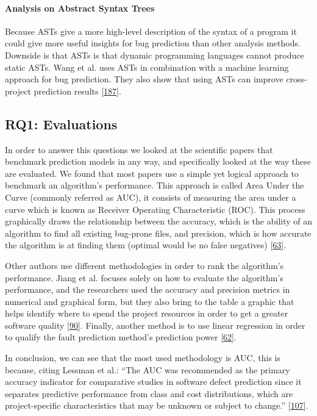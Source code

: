 \documentclass[]{book}
\let\oldparagraph\paragraph
\renewcommand{\paragraph}[1]{\oldparagraph{#1}\mbox{}}
\begin{document}
\paragraph{Analysis on Abstract Syntax
Trees}\label{analysis-on-abstract-syntax-trees}

Because ASTs give a more high-level description of the syntax of a
program it could give more useful insights for bug prediction than other
analysis methods. Downside is that ASTs is that dynamic programming
languages cannot produce static ASTs. Wang et al. uses ASTs in
combination with a machine learning approach for bug prediction. They
also show that using ASTs can improve cross-project prediction results
{[}\protect\hyperlink{ref-wang2016}{187}{]}.

\subsection{RQ1: Evaluations}\label{rq1-evaluations}

In order to answer this questions we looked at the scientific papers
that benchmark prediction models in any way, and specifically looked at
the way these are evaluated. We found that most papers use a simple yet
logical approach to benchmark an algorithm's performance. This approach
is called Area Under the Curve (commonly referred as AUC), it consists
of measuring the area under a curve which is known as Receiver Operating
Characteristic (ROC). This process graphically draws the relationship
between the accuracy, which is the ability of an algorithm to find all
existing bug-prone files, and precision, which is how accurate the
algorithm is at finding them (optimal would be no false negatives)
{[}\protect\hyperlink{ref-DAmbros2012}{63}{]}.

Other authors use different methodologies in order to rank the
algorithm's performance. Jiang et al. focuses solely on how to evaluate
the algorithm's performance, and the researchers used the accuracy and
precision metrics in numerical and graphical form, but they also bring
to the table a graphic that helps identify where to spend the project
resources in order to get a greater software quality
{[}\protect\hyperlink{ref-Jiang2008}{90}{]}. Finally, another method is
to use linear regression in order to qualify the fault prediction
method's prediction power {[}\protect\hyperlink{ref-DAmbros2010}{62}{]}.

In conclusion, we can see that the most used methodology is AUC, this is
because, citing Lessman et al.: ``The AUC was recommended as the primary
accuracy indicator for comparative studies in software defect prediction
since it separates predictive performance from class and cost
distributions, which are project-specific characteristics that may be
unknown or subject to change.''
{[}\protect\hyperlink{ref-Lessman2008}{107}{]}.
\end{document}
